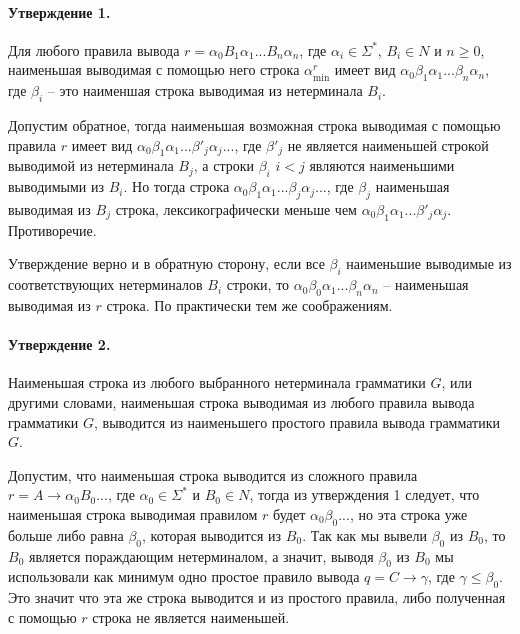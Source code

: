 \documentclass[12pt]{article}
\begin{document}
\paragraph{Утверждение 1.} Для любого правила вывода
$ r = \alpha_0 B_1 \alpha_1 ... B_n \alpha_n $, где
$ \alpha_i \in \Sigma^*$, $ B_i \in N $ и $ n \ge 0 $, наименьшая
выводимая с помощью него строка $ \alpha_{\min}^r $ имеет вид
$ \alpha_0 \beta_1 \alpha_1 ... \beta_n \alpha_n $, где
$ \beta_i $ -- это наименшая строка выводимая из нетерминала $ B_i $.

Допустим обратное, тогда наименьшая возможная строка выводимая с
помощью правила $ r $ имеет вид
$ \alpha_0 \beta_1 \alpha_1 ... \beta'_j \alpha_j ... $, где $ \beta'_j $
не является наименьшей строкой выводимой из нетерминала $ B_j $, а строки
$ \beta_i $ $ i < j $ являются наименьшими выводимыми из $ B_i $.
Но тогда
строка $ \alpha_0 \beta_1 \alpha_1 ... \beta_j \alpha_j ... $, где
$ \beta_j $ наименьшая выводимая из $ B_j $ строка, лексикографически меньше
чем $ \alpha_0 \beta_1 \alpha_1 ... \beta'_j \alpha_j $. Противоречие.

Утверждение верно и в обратную сторону, если все $ \beta_i $ наименьшие
выводимые из соответствующих нетерминалов $ B_i $ строки, то
$ \alpha_0 \beta_0 \alpha_1 ... \beta_n \alpha_n $ -- наименьшая выводимая
из $ r $ строка. По практически тем же соображениям.

\paragraph{Утверждение 2.} Наименьшая строка из любого выбранного
нетерминала грамматики $ G $, или другими словами, наименьшая строка
выводимая из любого правила вывода грамматики $ G $, выводится из
наименьшего простого правила вывода грамматики $ G $.

Допустим, что наименьшая строка выводится из сложного правила
$ r = A \rightarrow \alpha_0 B_0 ... $, где $ \alpha_0 \in \Sigma^* $ и
$ B_0 \in N $, тогда из утверждения 1 следует, что наименьшая строка
выводимая правилом $ r $ будет $ \alpha_0 \beta_0 ... $, но эта строка
уже больше либо равна $ \beta_0 $, которая выводится из $ B_0 $. Так как
мы вывели $ \beta_0 $ из $ B_0 $, то $ B_0 $ является пораждающим
нетерминалом, а значит, выводя $ \beta_0 $ из $ B_0 $ мы использовали
как минимум одно простое правило вывода $ q = C \rightarrow \gamma $,
где $ \gamma \le \beta_0 $. Это значит что эта же строка выводится и
из простого правила, либо полученная с помощью $ r $ строка не является
наименьшей.
\end{document}
